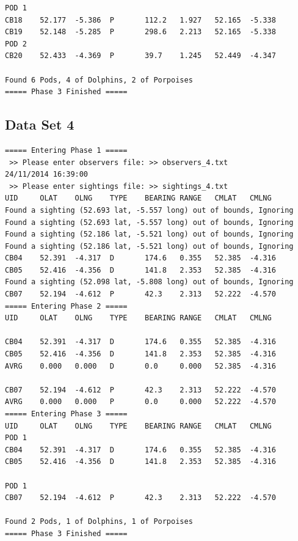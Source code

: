 \documentclass[10pt]{article}
\begin{document}
\begin{verbatim}
POD 1
CB18    52.177  -5.386  P       112.2   1.927   52.165  -5.338
CB19    52.148  -5.285  P       298.6   2.213   52.165  -5.338
POD 2
CB20    52.433  -4.369  P       39.7    1.245   52.449  -4.347

Found 6 Pods, 4 of Dolphins, 2 of Porpoises
===== Phase 3 Finished =====

            \end{verbatim}

        \newpage
        \subsection{Data Set 4}
            \begin{verbatim}
===== Entering Phase 1 =====
 >> Please enter observers file: >> observers_4.txt
24/11/2014 16:39:00
 >> Please enter sightings file: >> sightings_4.txt
UID     OLAT    OLNG    TYPE    BEARING RANGE   CMLAT   CMLNG
Found a sighting (52.693 lat, -5.557 long) out of bounds, Ignoring
Found a sighting (52.693 lat, -5.557 long) out of bounds, Ignoring
Found a sighting (52.186 lat, -5.521 long) out of bounds, Ignoring
Found a sighting (52.186 lat, -5.521 long) out of bounds, Ignoring
CB04    52.391  -4.317  D       174.6   0.355   52.385  -4.316
CB05    52.416  -4.356  D       141.8   2.353   52.385  -4.316
Found a sighting (52.098 lat, -5.808 long) out of bounds, Ignoring
CB07    52.194  -4.612  P       42.3    2.313   52.222  -4.570
===== Entering Phase 2 =====
UID     OLAT    OLNG    TYPE    BEARING RANGE   CMLAT   CMLNG

CB04    52.391  -4.317  D       174.6   0.355   52.385  -4.316
CB05    52.416  -4.356  D       141.8   2.353   52.385  -4.316
AVRG    0.000   0.000   D       0.0     0.000   52.385  -4.316

CB07    52.194  -4.612  P       42.3    2.313   52.222  -4.570
AVRG    0.000   0.000   P       0.0     0.000   52.222  -4.570
===== Entering Phase 3 =====
UID     OLAT    OLNG    TYPE    BEARING RANGE   CMLAT   CMLNG
POD 1
CB04    52.391  -4.317  D       174.6   0.355   52.385  -4.316
CB05    52.416  -4.356  D       141.8   2.353   52.385  -4.316

POD 1
CB07    52.194  -4.612  P       42.3    2.313   52.222  -4.570

Found 2 Pods, 1 of Dolphins, 1 of Porpoises
===== Phase 3 Finished =====
            \end{verbatim}

        \newpage
\end{document}
